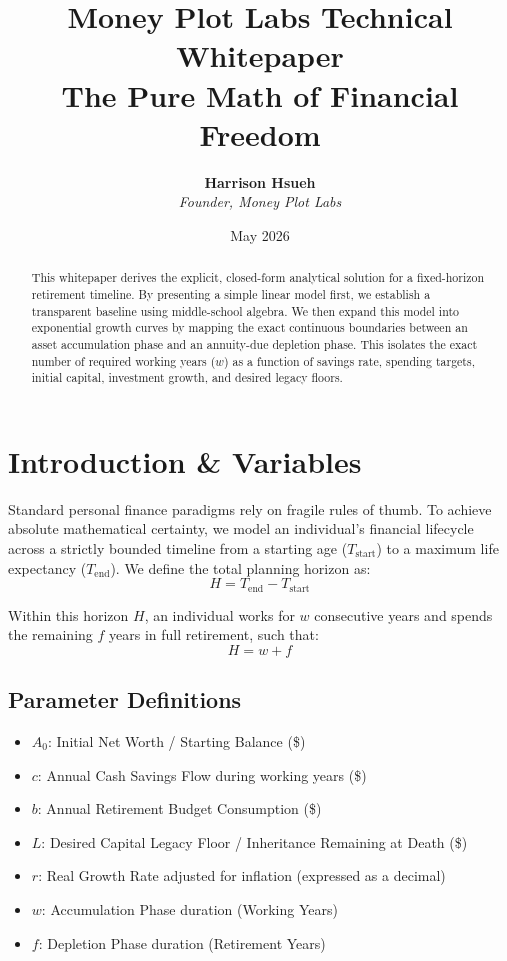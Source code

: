 \documentclass[11pt,letterpaper]{article}
\title{\textbf{\color{mpdark}Money Plot Labs Technical Whitepaper \\ The Pure Math of Financial Freedom}}
\author{\textbf{Harrison Hsueh} \\ \textit{Founder, Money Plot Labs}}
\date{May 2026}
\begin{document}
    
    \maketitle
    
    \begin{abstract}
    This whitepaper derives the explicit, closed-form analytical solution for a fixed-horizon retirement timeline. By presenting a simple linear model first, we establish a transparent baseline using middle-school algebra. We then expand this model into exponential growth curves by mapping the exact continuous boundaries between an asset accumulation phase and an annuity-due depletion phase. This isolates the exact number of required working years ($w$) as a function of savings rate, spending targets, initial capital, investment growth, and desired legacy floors.
    \end{abstract}
    
    \section{Introduction \& Variables}
    Standard personal finance paradigms rely on fragile rules of thumb. To achieve absolute mathematical certainty, we model an individual's financial lifecycle across a strictly bounded timeline from a starting age ($T_{\text{start}}$) to a maximum life expectancy ($T_{\text{end}}$). We define the total planning horizon as:
    \begin{equation}
    H = T_{\text{end}} - T_{\text{start}}
    \end{equation}
    
    Within this horizon $H$, an individual works for $w$ consecutive years and spends the remaining $f$ years in full retirement, such that:
    \begin{equation}
    H = w + f
    \end{equation}
    
    \subsection{Parameter Definitions}
    \begin{itemize}
        \item $A_0$: Initial Net Worth / Starting Balance (\$)
        \item $c$: Annual Cash Savings Flow during working years (\$)
        \item $b$: Annual Retirement Budget Consumption (\$)
        \item $L$: Desired Capital Legacy Floor / Inheritance Remaining at Death (\$)
        \item $r$: Real Growth Rate adjusted for inflation (expressed as a decimal)
        \item $w$: Accumulation Phase duration (Working Years)
        \item $f$: Depletion Phase duration (Retirement Years)
    \end{itemize}
    
\end{document}
